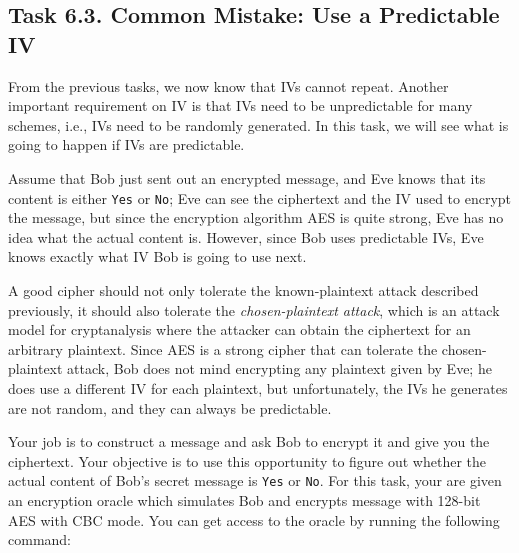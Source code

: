 \subsection{Task 6.3. Common Mistake: Use a Predictable IV}

From the previous tasks, we now know that IVs cannot
repeat. Another important requirement on IV is that
IVs need to be unpredictable for many schemes, i.e., IVs need to
be randomly generated. In this task, we will see what is going to happen if
IVs are predictable.

Assume that Bob just sent out an encrypted message, and Eve knows that its
content is either \texttt{Yes} or \texttt{No};
Eve can see the ciphertext and the IV used
to encrypt the message, but since the encryption algorithm AES is quite
strong, Eve has no idea what the actual content is. However, since Bob uses
predictable IVs, Eve knows exactly what IV Bob is going to use next.




A good cipher should not only tolerate the known-plaintext attack described
previously, it should also tolerate the \textit{chosen-plaintext attack},
which is an attack model for cryptanalysis where the attacker can obtain the
ciphertext for an arbitrary plaintext. Since AES is a strong cipher that
can tolerate the chosen-plaintext attack, Bob does not mind encrypting any
plaintext given by Eve; he does use a different IV for each plaintext,
but unfortunately, the IVs he generates are not random, and they can
always be predictable.

Your job is to construct a message and ask Bob to encrypt it
and give you the ciphertext.
Your objective is to use this opportunity to figure out
whether the actual content of Bob's secret message is \texttt{Yes} or \texttt{No}.
For this task, your are given an encryption oracle
which simulates Bob and encrypts message with 128-bit AES with CBC mode.
You can get access to the oracle by running the following command:

